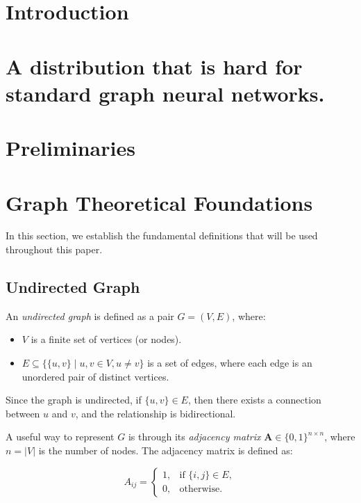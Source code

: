 \section{Introduction}



\section{A distribution that is hard for standard graph neural networks.}





\section{Preliminaries}

\section{Graph Theoretical Foundations}

In this section, we establish the fundamental definitions that will be used throughout this paper.

\subsection{Undirected Graph}
An \textit{undirected graph} is defined as a pair $G = (V, E)$, where:
\begin{itemize}
    \item $V$ is a finite set of vertices (or nodes).
    \item $E \subseteq \{ \{u,v\} \mid u,v \in V, u \neq v\}$ is a set of edges, where each edge is an unordered pair of distinct vertices.
\end{itemize}
Since the graph is undirected, if $\{u,v\} \in E$, then there exists a connection between $u$ and $v$, and the relationship is bidirectional.

A useful way to represent $G$ is through its \emph{adjacency matrix} $\mathbf{A} \in \{0,1\}^{n \times n}$, where $n = |V|$ is the number of nodes. The adjacency matrix is defined as:

\begin{equation}
A_{ij} =
\begin{cases}
    1, & \text{if } \{i,j\} \in E, \\
    0, & \text{otherwise}.
\end{cases}
\end{equation}

